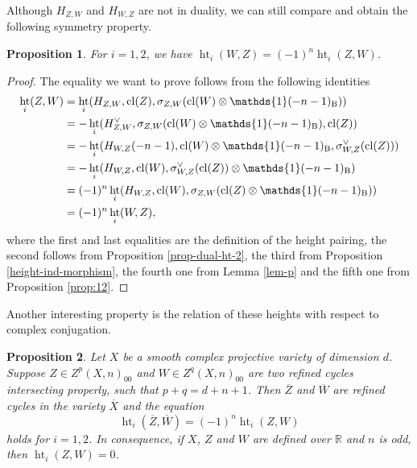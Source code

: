 \documentclass[11pt,a4paper]{amsart}
\newcommand{\Betti}{\text{\rm B}}
\newcommand{\R}{\mathds{R}}
\newcommand{\bfone}{{\mathds{1}}}
\DeclareMathOperator {\cl}{cl}
\DeclareMathOperator{\Ht}{ht}
\numberwithin{equation}{section}
\theoremstyle{plain}
\newtheorem{prop}{Proposition}[section]
\theoremstyle{definition}
\begin{document}
Although  $H_{Z,W}$ and
$H_{W,Z}$ are not in duality, we can still
compare and obtain the following symmetry property.
\begin{prop}\label{5-5-dual}
For $i=1,2$, we have $\Ht_{i}(W,Z)=(-1)^{n}\Ht_{i}(Z,W)$.
\end{prop}
\begin{proof}
  The equality we want to prove follows from the following identities
  \begin{align*}
    \Ht_{i}(Z,W)
    &=\Ht_{i}(H_{Z,W},\cl(Z),\sigma _{Z,W}(\cl(W)\otimes \bfone(-n-1)_{\Betti}))\\
    &=-\Ht_{i}(H^{\vee}_{Z,W},\sigma _{Z,W}(\cl(W)\otimes
      \bfone(-n-1)_{\Betti}),\cl(Z))\\
        &=-\Ht_{i}(H_{W,Z}(-n-1),\cl(W)\otimes
          \bfone(-n-1)_{\Betti},\sigma _{W,Z}^{\vee}(\cl(Z)))\\
        &=-\Ht_{i}(H_{W,Z},\cl(W),\sigma _{W,Z}^{\vee}(\cl(Z))\otimes
          \bfone(-n-1)_{\Betti})\\
        &=(-1)^{n}\Ht_{i}(H_{W,Z},\cl(W),\sigma _{Z,W}(\cl(Z)\otimes
          \bfone(-n-1)_{\Betti}))\\
    &=(-1)^{n}\Ht_i(W,Z),
  \end{align*}
  where the first and last equalities are the definition of the height
  pairing, the second follows from  Proposition \ref{prop-dual-ht-2},
  the third from Proposition \ref{height-ind-morphism}, the fourth one
  from Lemma \ref{lem-p} and the fifth one from Proposition \ref{prop:12}.
\end{proof}
Another interesting property is the relation of these heights with
respect to complex conjugation.
\begin{prop}\label{conj-ht-cycle}
Let $X$ be a smooth complex projective variety of dimension
$d$. Suppose $Z\in Z^{p}(X,n)_{00}$ and $W\in
Z^{q}(X,n)_{00}$ are two refined cycles intersecting properly,
such that $p+q=d+n+1$. Then $\overline Z$ and $\overline W$ are
refined cycles in the variety $\overline X$ and the equation 
\begin{equation}\label{eq:16}
\Ht_{i}(\overline{Z},\overline{W})=(-1)^{n}\Ht_{i}(Z,W)
\end{equation}
holds for $i=1,2$.
In consequence, if $X$, $Z$ and $W$ are defined over $\R$ and $n$ is
odd, then $\Ht_{i}(Z,W)=0$. 
\end{prop}
\end{document}
